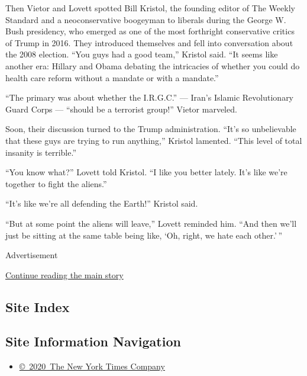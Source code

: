 Then Vietor and Lovett spotted Bill Kristol, the founding editor of The
Weekly Standard and a neoconservative boogeyman to liberals during the
George W. Bush presidency, who emerged as one of the most forthright
conservative critics of Trump in 2016. They introduced themselves and
fell into conversation about the 2008 election. ``You guys had a good
team,'' Kristol said. ``It seems like another era: Hillary and Obama
debating the intricacies of whether you could do health care reform
without a mandate or with a mandate.''

``The primary was about whether the I.R.G.C.'' --- Iran's Islamic
Revolutionary Guard Corps --- ``should be a terrorist group!'' Vietor
marveled.

Soon, their discussion turned to the Trump administration. ``It's so
unbelievable that these guys are trying to run anything,'' Kristol
lamented. ``This level of total insanity is terrible.''

``You know what?'' Lovett told Kristol. ``I like you better lately. It's
like we're together to fight the aliens.''

``It's like we're all defending the Earth!'' Kristol said.

``But at some point the aliens will leave,'' Lovett reminded him. ``And
then we'll just be sitting at the same table being like, `Oh, right, we
hate each other.' ''

Advertisement

\protect\hyperlink{after-bottom}{Continue reading the main story}

\hypertarget{site-index}{%
\subsection{Site Index}\label{site-index}}

\hypertarget{site-information-navigation}{%
\subsection{Site Information
Navigation}\label{site-information-navigation}}

\begin{itemize}
\tightlist
\item
  \href{https://help.nytimes3xbfgragh.onion/hc/en-us/articles/115014792127-Copyright-notice}{©~2020~The
  New York Times Company}
\end{itemize}

